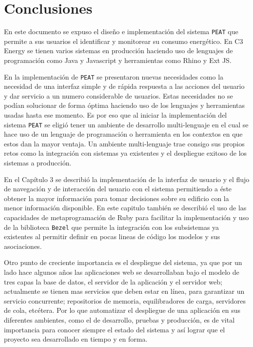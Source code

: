 \chapter{Conclusiones}

En este documento se expuso el diseño e implementación del sistema \texttt{PEAT} que
permite a sus usuarios el identificar y monitorear su consumo energético. En C3
Energy se tienen varios sistemas en producción haciendo uso de lenguajes de
programación como Java y Javascript y herramientas como Rhino y Ext JS.

En la implementación de \texttt{PEAT} se presentaron nuevas necesidades como la
necesidad de una interfaz simple y de rápida respuesta a las acciones del usuario y
dar servicio a un numero considerable de usuarios.
Estas necesidades no se podían solucionar de forma óptima haciendo uso de los
lenguajes y herramientas usadas hasta ese momento. Es por eso que al iniciar
la implementación del sistema \texttt{PEAT} se eligió tener un ambiente de
desarrollo multi-lenguaje en el cual se hace uso de un lenguaje de programación
o herramienta en los contextos en que estos dan la mayor ventaja. Un ambiente
multi-lenguaje trae consigo sus propios retos como la integración con sistemas ya
existentes y el despliegue exitoso de los sistemas a producción.

En el Capítulo 3 se describió la implementación de la interfaz de usuario y el flujo
de navegación y de interacción del usuario con el sistema permitiendo a éste obtener
la mayor información para tomar decisiones sobre su edificio con la menor información
disponible. En este capitulo también se describió el uso de las capacidades de
metaprogramación de Ruby para facilitar la implementación y uso de la biblioteca
\texttt{Bezel} que permite la integración con los subsistemas ya existentes al
permitir definir en pocas lineas de código los modelos y sus asociaciones.

Otro punto de creciente importancia es el despliegue del sistema, ya que por
un lado hace algunos años las aplicaciones web se desarrollaban bajo el modelo
de tres capas la base de datos, el servidor de la aplicación y el servidor web;
actualmente se tienen mas servicios que deben estar en línea, para garantizar un
servicio concurrente; repositorios de memoria, equilibradores de carga, servidores
de cola, etcétera. Por lo que automatizar el despliegue de una aplicación en sus
diferentes ambientes, como el de desarrollo, pruebas y producción, es de vital
importancia para conocer siempre el estado del sistema y así lograr que el proyecto
sea desarrollado en tiempo y en forma.

